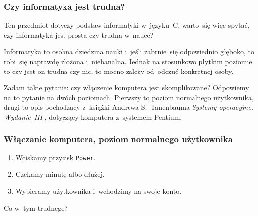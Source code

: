 \documentclass[10pt,t]{beamer}
\begin{document}
\begin{frame}
  \frametitle{Czy informatyka jest trudna?}


  Ten przedmiot dotyczy podstaw informatyki w~języku~C, warto~się
  więc spytać, czy informatyka jest prosta czy trudna w~nauce?

  Informatyka to osobna dziedzina nauki i~jeśli zabrnie~się odpowiednio
  głęboko, to robi~się naprawdę złożona i~niebanalna. Jednak na stosunkowo
  płytkim poziomie to czy jest on trudna czy nie, to mocno zależy od~odczuć
  konkretnej osoby.

  Zadam takie pytanie: czy włączenie komputera jest skomplikowane?
  Odpowiemy na to pytanie na dwóch poziomach. Pierwszy to poziom normalnego
  użytkownika, drugi to opis pochodzący z~książki Andrewa S.~Tanenbauma
  \textit{Systemy operacyjne. Wydanie~III}
  \parencite{Tannenbaum-Systemy-Operacyjne-Wydanie-III-Pub-2013}, dotyczący
  komputera z~systemem Pentium.

\end{frame}





\begin{frame}
  \frametitle{Włączanie komputera, poziom normalnego użytkownika}


  \begin{enumerate}

  \item Wciskamy przycisk \texttt{Power}.

  \item Czekamy minutę albo dłużej.

  \item Wybieramy użytkownika i~wchodzimy na swoje konto.

  \end{enumerate}

  Co w~tym trudnego?

\end{frame}
\end{document}
